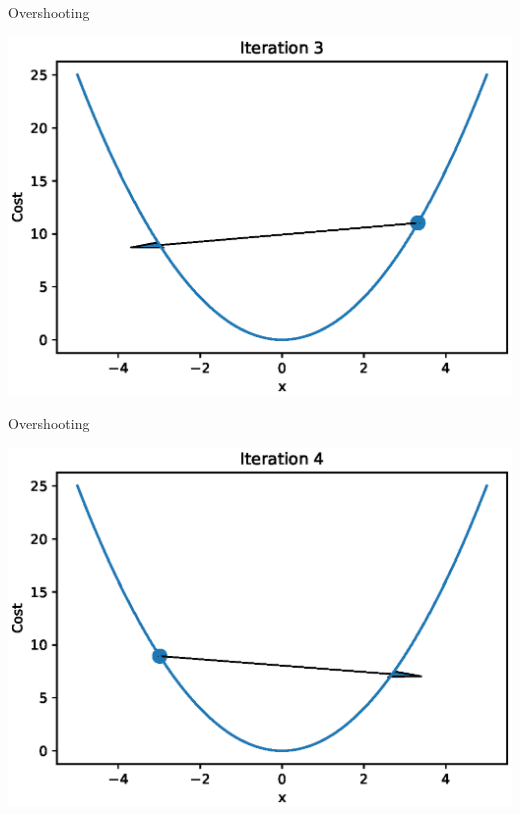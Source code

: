 \documentclass{beamer}
\begin{document}
\begin{frame}{Overshooting}
  \begin{center}
       \includegraphics[totalheight=6cm]{gradient-descent/overshooting-3.eps}
   \end{center}
\end{frame}

\begin{frame}{Overshooting}
  \begin{center}
       \includegraphics[totalheight=6cm]{gradient-descent/overshooting-4.eps}
   \end{center}
\end{frame}
\end{document}
